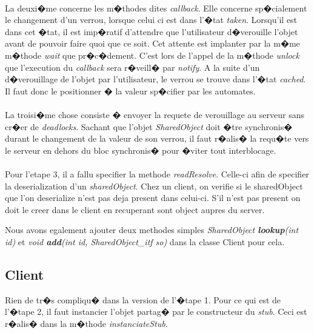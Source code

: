 \documentclass[]{report}   %
\begin{document}
\paragraph{}
La deuxi�me concerne les m�thodes dites \textit{callback}.
Elle concerne sp�cialement le changement d'un verrou, lorsque celui ci
est dans l'�tat \emph{taken}.
Lorsqu'il est dans cet �tat, il est imp�ratif d'attendre que
l'utilisateur d�verouille l'objet avant de pouvoir faire quoi que ce
soit.
Cet attente est implanter par la m�me m�thode \textit{wait} que
pr�c�dement. 
C'est lors de l'appel de la m�thode \textit{unlock} que l'execution du
\textit{callback} sera r�veill� par \textit{notify}.
A la suite d'un d�verouillage de l'objet par l'utilisateur, le verrou
se trouve dans l'�tat \textit{cached}. Il faut donc le positionner �
la valeur sp�cifier par les automates.

\paragraph{}
La troisi�me chose consiste � envoyer la requete de verouillage au
serveur sans cr�er de \textit{deadlocks}.
Sachant que l'objet \textit{SharedObject} doit �tre synchronis� durant
le changement de la valeur de son verrou, il faut r�alis� la requ�te
vers le serveur en dehors du bloc synchronis� pour �viter tout interblocage.

\paragraph{}
Pour l'etape 3, il a fallu specifier la methode \textit{readResolve}.
Celle-ci afin de specifier la deserialization d'un \textit{sharedObject}. Chez
un client, on verifie si le sharedObject que l'on deserialize n'est pas deja
present dans celui-ci. S'il n'est pas present on doit le creer dans le client en
recuperant sont object aupres du server.

Nous avons egalement ajouter deux methodes simples \textit{SharedObject
\textbf{lookup}(int id)} et
\textit{void \textbf{add}(int id, SharedObject_itf so)} dans la classe Client
pour cela.


\subsection{Client}
Rien de tr�s compliqu� dans la version de l'�tape 1.
Pour ce qui est de l'�tape 2, il faut instancier l'objet partag� par
le constructeur du \textit{stub}.
Ceci est r�alis� dans la m�thode \textit{instanciateStub}.
\end{document}
